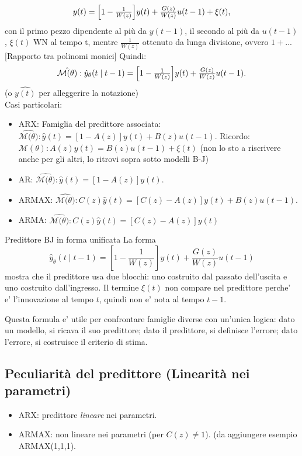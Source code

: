 \documentclass[11pt,a4paper]{article}
\begin{document}
\[
y(t)=\Bigl[1-\tfrac{1}{W(z)}\Bigr]y(t)+\tfrac{G(z)}{W(z)}u(t-1)+\xi(t),
\]
con il primo pezzo dipendente al più da $y(t-1)$, il secondo al più da $u(t-1)$, $\xi(t)$ WN al tempo t, mentre $\tfrac{1}{W(z)}$ ottenuto da lunga divisione, ovvero $1+...$[Rapporto tra polinomi monici] Quindi:
\[
\hat{\mathcal{M(\theta})}:\hat y_\theta(t\mid t-1)=\Bigl[1-\tfrac{1}{W(z)}\Bigr]y(t)+\tfrac{G(z)}{W(z)}u(t-1).
\]
(o $\hat{y(t)}$ per alleggerire la notazione)\\
Casi particolari:
\begin{itemize}
  \item ARX: Famiglia del predittore associata: $\hat{\mathcal{M(\theta})}: \hat y(t)=[1-A(z)]y(t)+B(z)u(t-1)$. Ricordo: $\mathcal{M(\theta)}: A(z)y(t)=B(z)u(t-1)+\xi(t)$ (non lo sto a riscrivere anche per gli altri, lo ritrovi sopra sotto modelli B-J)
  \item AR: $\hat{\mathcal{M(\theta})}:\hat y(t)=[1-A(z)]y(t)$.
  \item ARMAX: $\hat{\mathcal{M(\theta})}: C(z)\hat y(t)=[C(z)-A(z)]y(t)+B(z)u(t-1)$. 
  \item ARMA: $\hat{\mathcal{M(\theta})}: C(z)\hat y(t)=[C(z)-A(z)]y(t)$
\end{itemize}

\begin{spiegazione}{Predittore BJ in forma unificata}
La forma
\[
\hat y_\theta(t\mid t-1)=\left[1-\frac{1}{W(z)}\right]y(t)+\frac{G(z)}{W(z)}u(t-1)
\]
mostra che il predittore usa due blocchi: uno costruito dal passato dell'uscita e uno costruito dall'ingresso. Il termine $\xi(t)$ non compare nel predittore perche' e' l'innovazione al tempo $t$, quindi non e' nota al tempo $t-1$.

Questa formula e' utile per confrontare famiglie diverse con un'unica logica: dato un modello, si ricava il suo predittore; dato il predittore, si definisce l'errore; dato l'errore, si costruisce il criterio di stima.
\end{spiegazione}

\subsection{Peculiarità del predittore (Linearità nei parametri)}
\begin{itemize}
  \item ARX: predittore \emph{lineare} nei parametri.
  \item ARMAX: non lineare nei parametri (per $C(z)\neq 1$).
  (da aggiungere esempio ARMAX(1,1,1).
\end{itemize}
\end{document}
